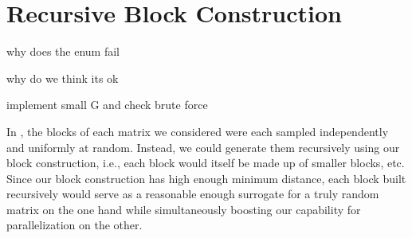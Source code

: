 \section{Recursive Block Construction}\label{sec:recursiveblock}

why does the enum fail

why do we think its ok

implement small G and check brute force




In , the blocks of each matrix we considered were each sampled independently and uniformly at random. Instead, we could generate them recursively using our block construction, i.e., each block would itself be made up of smaller blocks, etc. Since our block construction has high enough minimum distance, each block built recursively would serve as a reasonable enough surrogate for a truly random matrix on the one hand while simultaneously boosting our capability for parallelization on the other.



